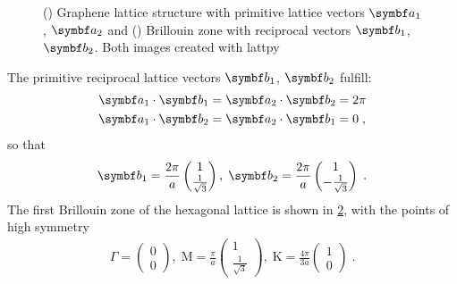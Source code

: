\documentclass[../notes.tex]{subfiles}
\begin{document}
\begin{figure}[tb]
	\centering
	\begin{subfigure}[t]{0.5\textwidth}
		\centering
		\caption{\hfill\null}\label{sfig:graphene lattice structure}
		
	\end{subfigure}%
	\begin{subfigure}[t]{0.5\textwidth}
		\centering
		\caption{\hfill\null}\label{sfig:graphene Brillouin zone}
		
	\end{subfigure}
	\caption{() Graphene lattice structure with primitive lattice vectors \(\vb{a}_1\), \(\vb{a}_2\) and () Brillouin zone with reciprocal vectors \(\vb{b}_1\), \(\vb{b}_2\). Both images created with lattpy \cite{Jones_lattpy_2022}}
	\label{fig:Graphene lattice structure and Brilluoin zone}
\end{figure}
The primitive reciprocal lattice vectors \(\vb{b}_1\), \(\vb{b}_2\) fulfill:
\begin{align}
	\vb{a}_1 \cdot \vb{b}_1 &= \vb{a}_2 \cdot \vb{b}_2 = 2\pi \\
	\vb{a}_1 \cdot \vb{b}_2 &= \vb{a}_2 \cdot \vb{b}_1 = 0\;,
\end{align}
so that
\begin{align}
	\vb{b}_1 = \frac{2\pi}{a} \begin{pmatrix} 1 \\ \frac{1}{\sqrt{3}} \end{pmatrix},\;
	\vb{b}_2 = \frac{2\pi}{a} \begin{pmatrix} 1 \\ - \frac{1}{\sqrt{3}} \end{pmatrix} \;.
\end{align}
The first Brillouin zone of the hexagonal lattice is shown in \cref{sfig:graphene Brillouin zone}, with the points of high symmetry
\begin{align}
	\Gamma = \begin{pmatrix} 0 \\ 0 \end{pmatrix},\;
	\mathrm{M} = \frac{\pi}{a} \begin{pmatrix} 1 \\ \frac{1}{\sqrt{3}} \end{pmatrix},\;
	\mathrm{K} = \frac{4\pi}{3 a} \begin{pmatrix} 1 \\ 0 \end{pmatrix}\;.
\end{align}
\end{document}
